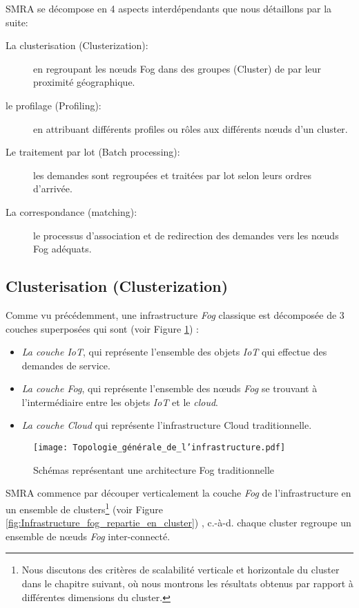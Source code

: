 SMRA se décompose en 4 aspects interdépendants que nous détaillons par la suite:


\begin{description}
  \item[La clusterisation (Clusterization):] en regroupant les nœuds Fog dans des groupes (Cluster) de par leur proximité géographique.
  \item[le profilage (Profiling):] en attribuant différents profiles ou rôles aux différents nœuds d'un cluster.
  \item[Le traitement par lot (Batch processing):] les demandes sont regroupées et traitées par lot selon leurs ordres d'arrivée.
  \item[La correspondance (matching):] le processus d'association et de redirection des demandes vers les nœuds Fog adéquats.
\end{description}
\newpage
\subsection{Clusterisation (Clusterization)}


Comme vu précédemment, une infrastructure \emph{Fog} classique est décomposée de 3 couches superposées qui sont (voir Figure \ref{fig:Topologie_generale_de_linfrastructure}) :


\begin{itemize}
    \item \emph{La couche IoT}, qui représente l'ensemble des objets \emph{IoT} qui effectue des demandes de service.
    \item \emph{La couche Fog}, qui représente l'ensemble des nœuds \emph{Fog} se trouvant à l'intermédiaire entre les objets \emph{IoT} et le \emph{cloud}.
    \item \emph{La couche Cloud} qui représente l'infrastructure Cloud traditionnelle.
\end{itemize}


\begin{figure}[H]
    \centering
    \texttt{[image: Topologie\_générale\_de\_l'infrastructure.pdf]}
    \caption{Schémas représentant une architecture Fog traditionnelle}
    \label{fig:Topologie_generale_de_linfrastructure}
\end{figure}


\par SMRA commence par découper verticalement la couche \emph{Fog} de l'infrastructure en un ensemble de clusters\footnote{Nous discutons des critères de scalabilité verticale et horizontale du cluster dans le chapitre suivant, où nous montrons les résultats obtenus par rapport à différentes dimensions du cluster.} (voir Figure \ref{fig:Infrastructure_fog_repartie_en_cluster}) , c.-à-d. chaque cluster regroupe un ensemble de nœuds \emph{Fog} inter-connecté.


